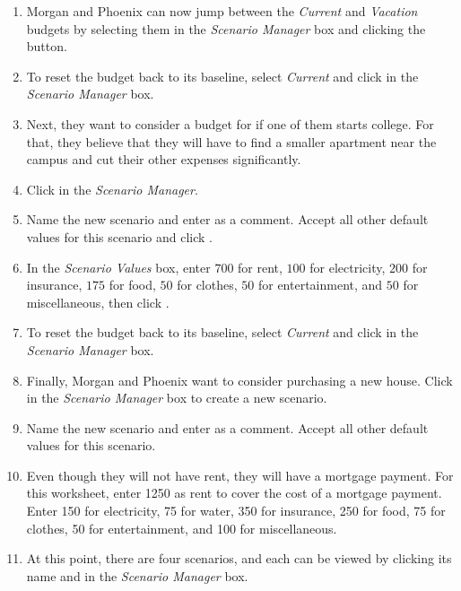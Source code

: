 \begin{enumerate}[resume]	
	
	\item Morgan and Phoenix can now jump between the \textit{Current} and \textit{Vacation} budgets by selecting them in the \textit{Scenario Manager} box and clicking the  button.
	\item To reset the budget back to its baseline, select \textit{Current} and click  in the \textit{Scenario Manager} box.
	\item Next, they want to consider a budget for if one of them starts college. For that, they believe that they will have to find a smaller apartment near the campus and cut their other expenses significantly.
	\item Click  in the \textit{Scenario Manager}.
	\item Name the new scenario  and enter  as a comment. Accept all other default values for this scenario and click .
	\item In the \textit{Scenario Values} box, enter $ 700 $ for rent, $ 100 $ for electricity, $ 200 $ for insurance, $ 175 $ for food, $ 50 $ for clothes, $ 50 $ for entertainment, and $ 50 $ for miscellaneous, then click .
	\item To reset the budget back to its baseline, select \textit{Current} and click  in the \textit{Scenario Manager} box.
	\item Finally, Morgan and Phoenix want to consider purchasing a new house. Click  in the \textit{Scenario Manager} box to create a new scenario.
	\item Name the new scenario  and enter  as a comment. Accept all other default values for this scenario.
	\item Even though they will not have rent, they will have a mortgage payment. For this worksheet, enter 1250 as rent to cover the cost of a mortgage payment. Enter 150 for electricity, 75 for water, 350 for insurance, 250 for food, 75 for clothes, 50 for entertainment, and 100 for miscellaneous.
	\item At this point, there are four scenarios, and each can be viewed by clicking its name and  in the \textit{Scenario Manager} box. 
	
\end{enumerate}

